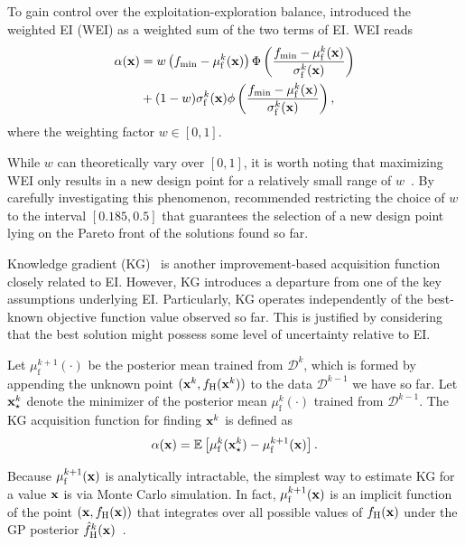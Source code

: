 \documentclass[iicol,sn-basic]{sn-jnl}%
\theoremstyle{thmstyleone}%
\theoremstyle{thmstyletwo}
\theoremstyle{thmstylethree}
\begin{document}
\begin{linenumbers}
To gain control over the exploitation-exploration balance, \cite{Sobester2005} introduced the weighted EI (WEI) as a weighted sum of the two terms of EI.
WEI reads
\begin{equation}\label{Eq44}
	\begin{aligned}
		\alpha({\bf x}) & = w\left( f_\text{min}-\mu_\text{f}^k({\bf x})\right)\Phi\left(\frac{f_\text{min}-\mu_\text{f}^k({\bf x})}{\sigma_\text{f}^k({\bf x})}\right)\\
		&+(1-w)\sigma_\text{f}^k({\bf x})\phi\left(\frac{f_\text{min}-\mu_\text{f}^k({\bf x})}{\sigma_\text{f}^k({\bf x})}\right),
	\end{aligned}
\end{equation}
where the weighting factor $w \in [0,1]$.

While $w$ can theoretically vary over $[0,1]$, it is worth noting that maximizing WEI only results in a new design point for a relatively small range of $w$~\citep{Ath2021}.
By carefully investigating this phenomenon, \cite{Ath2021} recommended restricting the choice of $w$ to the interval $[0.185,0.5]$ that guarantees the selection of a new design point lying on the Pareto front of the solutions found so far.

Knowledge gradient (KG)~\citep{Frazier2008} is another improvement-based acquisition function closely related to EI.
However, KG introduces a departure from one of the key assumptions underlying EI.
Particularly, KG operates independently of the best-known objective function value observed so far.
This is justified by considering that the best solution might possess some level of uncertainty relative to EI.

Let $\mu_\text{f}^{k+1}({\cdot})$ be the posterior mean trained from $\mathcal{D}^{k}$, which is formed by appending the unknown point $({\bf x}^k,f_\text{H}({\bf x}^k))$ to the data $\mathcal{D}^{k-1}$ we have so far.
Let ${\bf x}_{\star}^k$ denote the minimizer of the posterior mean $\mu_\text{f}^k({\cdot})$ trained from $\mathcal{D}^{k-1}$.
The KG acquisition function for finding ${\bf x}^k$ is defined as~\citep{Frazier2008}
\begin{equation}\label{Eq45}
	\alpha({\bf x}) = \mathbb{E}\left[\mu_\text{f}^k({\bf x}_{\star}^k)-\mu_\text{f}^{k+1}({\bf x})\right].
\end{equation}

Because $\mu_\text{f}^{k+1}({\bf x})$ is analytically intractable, the simplest way to estimate KG for a value ${\bf x}$ is via Monte Carlo simulation.
In fact, $\mu_\text{f}^{k+1}({\bf x})$ is an implicit function of the point $({\bf x},f_\text{H}({\bf x}))$ that integrates over all possible values of $f_\text{H}({\bf x})$ under the GP posterior $\hat{f}_\text{H}^k({\bf x})$~\citep{Frazier2018}.


\end{linenumbers}
\end{document}
